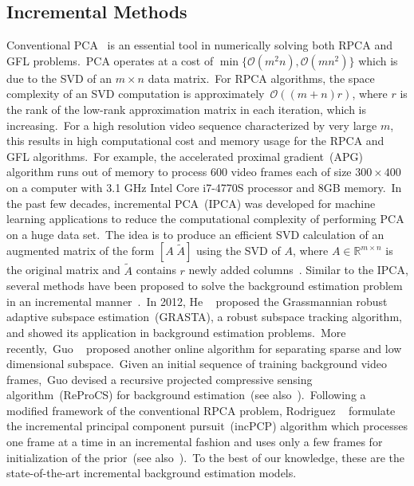 \documentclass[10pt,twocolumn,letterpaper]{article}
\begin{document}
\subsection{Incremental Methods} 
\vspace{-0.0in}
Conventional PCA~\cite{pca} is an essential tool in numerically solving both RPCA and GFL problems.~PCA operates at a cost of $\min\{\mathcal{O}(m^2n),\mathcal{O}(mn^2)\}$ which is due to the SVD of an $m\times n$ data matrix.~For RPCA algorithms, the space complexity of an SVD computation is approximately~$\mathcal{O}((m+n)r)$, where $r$ is the rank of the low-rank approximation matrix in each iteration, which is increasing.~For a high resolution video sequence characterized by very large $m$, this results in high computational cost and memory usage for the RPCA and GFL algorithms.~For example, the accelerated proximal gradient~(APG) algorithm runs out of memory to process 600 video frames each of size $300\times 400$ on a computer with 3.1 GHz Intel Core i7-4770S processor and 8GB memory.~In the past few decades, incremental PCA~(IPCA) was developed for machine learning applications to reduce the computational complexity of performing PCA on a huge data set.~The idea is to produce an efficient SVD calculation of an augmented matrix of the form $[A\;\tilde{A}]$ using the SVD of $A$, where $A\in\mathbb{R}^{m\times n}$ is the original matrix and $\tilde{A}$ contains $r$ newly added columns~\cite{incpca}. Similar to the IPCA, several methods have been proposed to solve the background estimation problem in an incremental manner~\cite{mmb,inrpca}.~In 2012, He \etal~\cite{grasta} proposed the Grassmannian robust adaptive subspace estimation~(GRASTA), a robust subspace tracking algorithm, and showed its application in background estimation problems.~More recently,~Guo \etal~\cite{reprocs} proposed another online algorithm for separating sparse and low dimensional subspace.~Given an initial sequence of training background video frames,~Guo \etal devised a recursive projected compressive sensing algorithm~(ReProCS) for background estimation~(see also~\cite{pracreprocs,modified_cs}).~Following a modified framework of the conventional RPCA problem, Rodriguez \etal~\cite{incpcp} formulate the incremental principal component pursuit~(incPCP) algorithm which processes one frame at a time in an incremental fashion and uses only a few frames for initialization of the prior~(see also~\cite{matlab_pcp,inpcp_jitter}).~To the best of our knowledge, these are the state-of-the-art incremental background estimation models.
\vspace{-0.0in}
\end{document}

